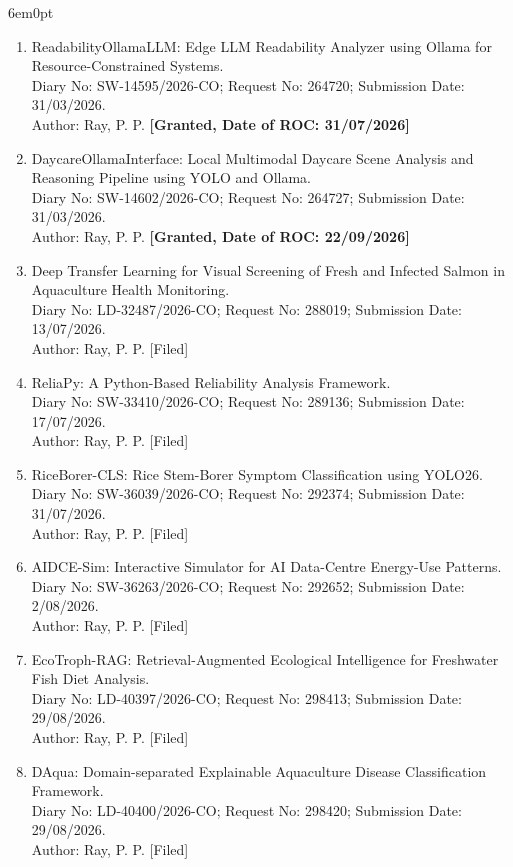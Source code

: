 \documentclass[11pt,a4paper]{moderncv}
\begin{document}
\begin{adjustwidth}{6em}{0pt}
\begin{enumerate}
		\item ReadabilityOllamaLLM: Edge LLM Readability Analyzer using Ollama for Resource-Constrained Systems. \\
		Diary No: SW-14595/2026-CO; Request No: 264720; Submission Date: 31/03/2026. \\
		Author: Ray, P. P. \textbf{[Granted, Date of ROC: 31/07/2026]}
		
		\item DaycareOllamaInterface: Local Multimodal Daycare Scene Analysis and Reasoning Pipeline using YOLO and Ollama. \\
		Diary No: SW-14602/2026-CO; Request No: 264727; Submission Date: 31/03/2026. \\
		Author: Ray, P. P. \textbf{[Granted, Date of ROC: 22/09/2026]}
		
		\item Deep Transfer Learning for Visual Screening of Fresh and Infected Salmon in Aquaculture Health Monitoring. \\
		Diary No: LD-32487/2026-CO; Request No: 288019; Submission Date: 13/07/2026. \\
		Author: Ray, P. P. [Filed]
		
		
		\item ReliaPy: A Python-Based Reliability Analysis Framework. \\
		Diary No: SW-33410/2026-CO; Request No: 289136; Submission Date: 17/07/2026. \\
		Author: Ray, P. P. [Filed]
		
		\item RiceBorer-CLS: Rice Stem-Borer Symptom Classification using YOLO26. \\
		Diary No: SW-36039/2026-CO; Request No: 292374; Submission Date: 31/07/2026. \\
		Author: Ray, P. P. [Filed]

		\item AIDCE-Sim: Interactive Simulator for AI Data-Centre Energy-Use Patterns. \\
		Diary No: SW-36263/2026-CO; Request No: 292652; Submission Date: 2/08/2026. \\
		Author: Ray, P. P. [Filed]

		\item EcoTroph-RAG: Retrieval-Augmented Ecological Intelligence for
		Freshwater Fish Diet Analysis. \\
		Diary No: LD-40397/2026-CO; Request No: 298413; Submission Date: 29/08/2026. \\
		Author: Ray, P. P. [Filed]


		\item DAqua: Domain-separated Explainable Aquaculture Disease Classification Framework. \\
		Diary No: LD-40400/2026-CO; Request No: 298420; Submission Date: 29/08/2026. \\
		Author: Ray, P. P. [Filed]
		
		
	\end{enumerate}
\end{adjustwidth}
\end{document}
